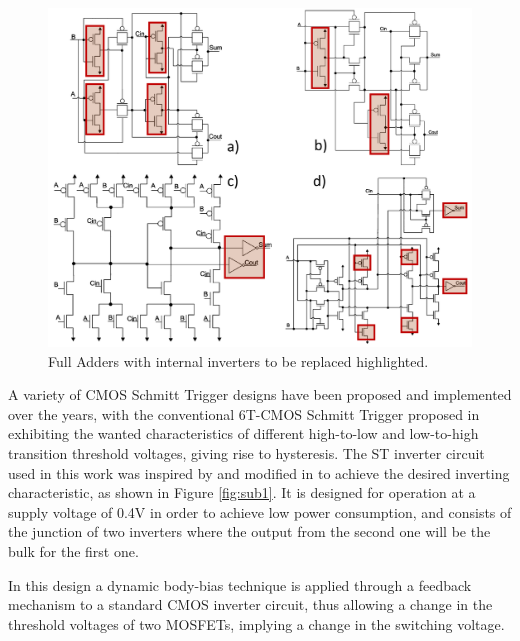 \documentclass[ecp,tc, english]{iiufrgs}
\begin{document}
\begin{figure}[H]
\centering
\includegraphics[width=1\textwidth]{FAs.png}
\caption{Full Adders with internal inverters to be replaced highlighted.}
\label{fig:Fig5}
\end{figure}

A variety of CMOS Schmitt Trigger designs have been proposed and implemented over the years, with the conventional 6T-CMOS Schmitt Trigger proposed in \cite{doki1984cmos} exhibiting the wanted characteristics of different high-to-low and low-to-high transition threshold voltages, giving rise to hysteresis. The ST inverter circuit used in this work was inspired by \cite{zhang2003low} and modified in \cite{dokania2015circuit} to achieve the desired inverting characteristic, as shown in Figure \ref{fig:sub1}. It is designed for operation at a supply voltage of 0.4V in order to achieve low power consumption, and consists of the junction of two inverters where the output from the second one will be the bulk for the first one.  

In this design a dynamic body-bias technique is applied through a feedback mechanism to a standard CMOS inverter circuit, thus allowing a change in the threshold voltages of two MOSFETs, implying a change in the switching voltage. 
\end{document}
